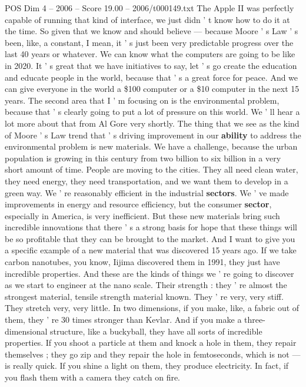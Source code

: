 \begin{textsample}{POS Dim 4 – 2006 – Score 19.00 – 2006/t000149.txt}
The Apple II was perfectly capable of running that kind of interface, we just didn ' t know how to do it at the time.
So given that we know and should believe — because Moore ' s Law ' s been, like, a constant, I mean, it ' s just been very predictable progress over the last 40 years or whatever.
We can know what the computers are going to be like in 2020.
It ' s great that we have initiatives to say, let ' s go create the education and educate people in the world, because that ' s a great force for peace.
And we can give everyone in the world a \$100 computer or a \$10 computer in the next 15 years.
The second area that I ' m focusing on is the environmental problem, because that ' s clearly going to put a lot of pressure on this world.
We ' ll hear a lot more about that from Al Gore very shortly.
The thing that we see as the kind of Moore ' s Law trend that ' s driving improvement in our \textbf{ability} to address the environmental problem is new materials.
We have a challenge, because the urban population is growing in this century from two billion to six billion in a very short amount of time.
People are moving to the cities.
They all need clean water, they need energy, they need transportation, and we want them to develop in a green way.
We ' re reasonably efficient in the industrial \textbf{sectors}.
We ' ve made improvements in energy and resource efficiency, but the consumer \textbf{sector}, especially in America, is very inefficient.
But these new materials bring such incredible innovations that there ' s a strong basis for hope that these things will be so profitable that they can be brought to the market.
And I want to give you a specific example of a new material that was discovered 15 years ago.
If we take carbon nanotubes, you know, Iijima discovered them in 1991, they just have incredible properties.
And these are the kinds of things we ' re going to discover as we start to engineer at the nano scale.
Their strength : they ' re almost the strongest material, tensile strength material known.
They ' re very, very stiff.
They stretch very, very little.
In two dimensions, if you make, like, a fabric out of them, they ' re 30 times stronger than Kevlar.
And if you make a three-dimensional structure, like a buckyball, they have all sorts of incredible properties.
If you shoot a particle at them and knock a hole in them, they repair themselves ; they go zip and they repair the hole in femtoseconds, which is not — is really quick.
If you shine a light on them, they produce electricity.
In fact, if you flash them with a camera they catch on fire.

\end{textsample}
